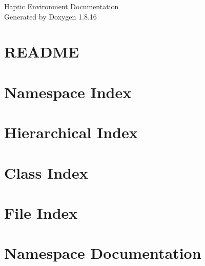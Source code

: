 \let\mypdfximage\pdfximage\def\pdfximage{\immediate\mypdfximage}\documentclass[twoside]{book}
\newcommand{\+}{\discretionary{\mbox{\scriptsize$\hookleftarrow$}}{}{}}
\newcommand{\clearemptydoublepage}{%
  \newpage{\pagestyle{empty}\cleardoublepage}%
}
\begin{document}
\hypersetup{pageanchor=false,
             bookmarksnumbered=true,
             pdfencoding=unicode
            }
\begin{titlepage}
\vspace*{7cm}
\begin{center}%
{\Large Haptic Environment Documentation }\\
\vspace*{1cm}
{\large Generated by Doxygen 1.8.16}\\
\end{center}
\end{titlepage}
\clearemptydoublepage
{}
\tableofcontents
\clearemptydoublepage
{}
\hypersetup{pageanchor=true}

\chapter{R\+E\+A\+D\+ME}
\label{md__home_mfl24__documents_chai_projects_haptic_environment__r_e_a_d_m_e}

\chapter{Namespace Index}

\chapter{Hierarchical Index}

\chapter{Class Index}

\chapter{File Index}

\chapter{Namespace Documentation}

\end{document}
